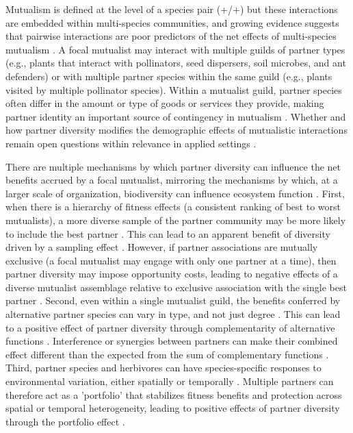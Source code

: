 \documentclass[11pt]{article}
\begin{document}
Mutualism is defined at the level of a species pair (+/+) but these interactions are embedded within multi-species communities, and growing evidence suggests that pairwise interactions are poor predictors of the net effects of multi-species mutualism \citep{Afkhami2014,Palmer2010,Bascompte2009,Dattilo2014}. 
A focal mutualist may interact with multiple guilds of partner types (e.g., plants that interact with pollinators, seed dispersers, soil microbes, and ant defenders) or with multiple partner species within the same guild (e.g., plants visited by multiple pollinator species). 
Within a mutualist guild, partner species often differ in the amount or type of goods or services they provide, making partner identity an important source of contingency in mutualism \citep{Stanton2003}. 
Whether and how partner diversity modifies the demographic effects of mutualistic interactions remain open questions within relevance in applied settings \citep{rogers2014}. 

There are multiple mechanisms by which partner diversity can influence the net benefits accrued by a focal mutualist, mirroring the mechanisms by which, at a larger scale of organization, biodiversity can influence ecosystem function \cite{Yeung2006,Barrett2015,Ushio2020}. 
First, when there is a hierarchy of fitness effects (a consistent ranking of best to worst mutualists), a more diverse sample of the partner community may be more likely to include the best partner \cite{Frederickson2013}.
This can lead to an apparent benefit of diversity driven by a sampling effect \cite{Batstone2018}. 
However, if partner associations are mutually exclusive (a focal mutualist may engage with only one partner at a time), then partner diversity may impose opportunity costs, leading to negative effects of a diverse mutualist assemblage relative to exclusive association with the single best partner \citep{Miller2007}. 
Second, even within a single mutualist guild, the benefits conferred by alternative partner species can vary in type, and not just degree \cite{Stachowicz2005,Bronstein2006,Stanton2003}. 
This can lead to a positive effect of partner diversity through complementarity of alternative functions \cite{Batstone2018}. 
Interference or synergies between partners can make their combined effect different than the expected from the sum of complementary functions \cite{Afkhami2014}. 
Third, partner species and herbivores can have species-specific responses to environmental variation, either spatially \citep{Ollerton2006} or temporally \citep{Alarcon2008}. 
Multiple partners can therefore act as a 'portfolio' that stabilizes fitness benefits and protection across spatial or temporal heterogeneity, leading to positive effects of partner diversity through the portfolio effect \cite{Batstone2018,Lazaro2022,Horvitz1990}. 
\end{document}
